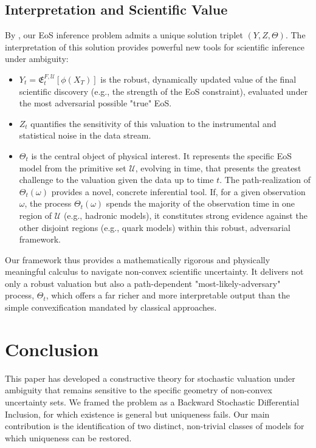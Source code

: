 \documentclass[12pt, letterpaper]{amsart}
\newcommand{\Efrak}{\mathfrak{E}}
\newcommand{\Efrakgen}{\Efrak^{F, \Ucal}}
\newcommand{\Ucal}{\mathcal{U}}
\theoremstyle{plain}
\theoremstyle{definition}
\theoremstyle{remark}
\numberwithin{equation}{section} %
\begin{document}
\subsection{Interpretation and Scientific Value}
By , our EoS inference problem admits a unique solution triplet $(Y,Z,\Theta)$. The interpretation of this solution provides powerful new tools for scientific inference under ambiguity:
\begin{itemize}
    \item $Y_t = \Efrakgen_t[\phi(X_T)]$ is the robust, dynamically updated value of the final scientific discovery (e.g., the strength of the EoS constraint), evaluated under the most adversarial possible "true" EoS.

    \item $Z_t$ quantifies the sensitivity of this valuation to the instrumental and statistical noise in the data stream.

    \item $\Theta_t$ is the central object of physical interest. It represents the specific EoS model from the primitive set \(\Ucal\), evolving in time, that presents the greatest challenge to the valuation given the data up to time $t$. The path-realization of $\Theta_t(\omega)$ provides a novel, concrete inferential tool. If, for a given observation \(\omega\), the process $\Theta_t(\omega)$ spends the majority of the observation time in one region of $\Ucal$ (e.g., hadronic models), it constitutes strong evidence against the other disjoint regions (e.g., quark models) within this robust, adversarial framework.
\end{itemize}
Our framework thus provides a mathematically rigorous and physically meaningful calculus to navigate non-convex scientific uncertainty. It delivers not only a robust valuation but also a path-dependent "most-likely-adversary" process, \(\Theta_t\), which offers a far richer and more interpretable output than the simple convexification mandated by classical approaches.

\section{Conclusion}
\label{sec:conclusion}

This paper has developed a constructive theory for stochastic valuation under ambiguity that remains sensitive to the specific geometry of non-convex uncertainty sets. We framed the problem as a Backward Stochastic Differential Inclusion, for which existence is general but uniqueness fails. Our main contribution is the identification of two distinct, non-trivial classes of models for which uniqueness can be restored.
\end{document}
